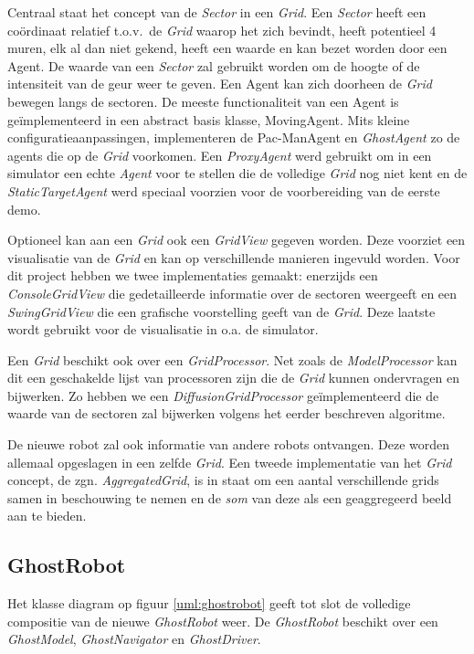 \documentclass[12pt,a4paper]{report}
\begin{document}
Centraal staat het concept van de \emph{Sector} in een \emph{Grid}. Een \emph{Sector} heeft een co\"ordinaat relatief t.o.v.\ de \emph{Grid} waarop het zich bevindt, heeft potentieel 4 muren, elk al dan niet gekend, heeft een waarde en kan bezet worden door een Agent. De waarde van een \emph{Sector} zal gebruikt worden om de hoogte of de intensiteit van de geur weer te geven. Een Agent kan zich doorheen de \emph{Grid} bewegen langs de sectoren. De meeste functionaliteit van een Agent is ge\"implementeerd in een abstract basis klasse, MovingAgent. Mits kleine configuratieaanpassingen, implementeren de Pac-ManAgent en \emph{GhostAgent} zo de agents die op de \emph{Grid} voorkomen. Een \emph{ProxyAgent} werd gebruikt om in een simulator een echte \emph{Agent} voor te stellen die de volledige \emph{Grid} nog niet kent en de \emph{StaticTargetAgent} werd speciaal voorzien voor de voorbereiding van de eerste demo.

Optioneel kan aan een \emph{Grid} ook een \emph{GridView} gegeven worden. Deze voorziet een visualisatie van de \emph{Grid} en kan op verschillende manieren ingevuld worden. Voor dit project hebben we twee implementaties gemaakt: enerzijds een \emph{ConsoleGridView} die gedetailleerde informatie over de sectoren weergeeft en een \emph{SwingGridView} die een grafische voorstelling geeft van de \emph{Grid}. Deze laatste wordt gebruikt voor de visualisatie in o.a. de simulator.

Een \emph{Grid} beschikt ook over een \emph{GridProcessor}. Net zoals de \emph{ModelProcessor} kan dit een geschakelde lijst van processoren zijn die de \emph{Grid} kunnen ondervragen en bijwerken. Zo hebben we een \emph{DiffusionGridProcessor} ge\"implementeerd die de waarde van de sectoren zal bijwerken volgens het eerder beschreven algoritme.

De nieuwe robot zal ook informatie van andere robots ontvangen. Deze worden allemaal opgeslagen in een zelfde \emph{Grid}. Een tweede implementatie van het \emph{Grid} concept, de zgn. \emph{AggregatedGrid}, is in staat om een aantal verschillende grids samen in beschouwing te nemen en de \emph{som} van deze als een geaggregeerd beeld aan te bieden.

\subsection{GhostRobot}

Het klasse diagram op figuur \ref{uml:ghostrobot} geeft tot slot de volledige compositie van de nieuwe \emph{GhostRobot} weer. De \emph{GhostRobot} beschikt over een \emph{GhostModel}, \emph{GhostNavigator} en \emph{GhostDriver}.
\end{document}
